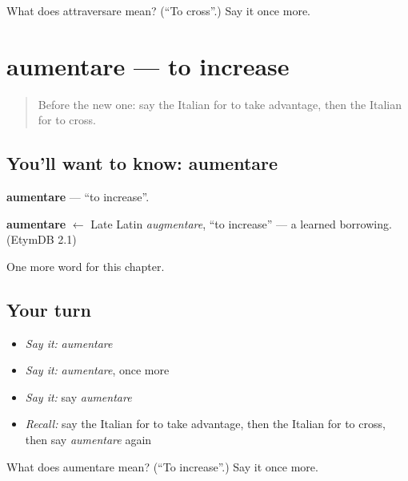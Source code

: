 \begin{tcolorbox}[breakable,colback=teal!4,colframe=teal!35!black,title={Before you move on}]
What does attraversare mean? (\textquotedblleft{}To cross\textquotedblright{}.) Say it once more.
\end{tcolorbox}
\section[aumentare]{aumentare — to increase}

\label{lesson:IT-C208-aumentare}



\begin{quote}
Before the new one: say the Italian for to take advantage, then the Italian for to cross.
\end{quote}

\subsection*{You'll want to know: aumentare}
\textbf{aumentare} — \textquotedblleft{}to increase\textquotedblright{}.

\begin{cousinweb}
\textbf{aumentare} $\leftarrow$ Late Latin \emph{augmentare}, \textquotedblleft{}to increase\textquotedblright{} — a learned borrowing. (EtymDB 2.1)
\end{cousinweb}

\begin{grammarlens}[title={What you've built}]
One more word for this chapter.
\end{grammarlens}

\subsection*{Your turn}
\begin{itemize}
\raggedright
  \item \emph{Say it:} \emph{aumentare}
  \item \emph{Say it:} \emph{aumentare}, once more
  \item \emph{Say it:} say \emph{aumentare}
  \item \emph{Recall:} say the Italian for to take advantage, then the Italian for to cross, then say \emph{aumentare} again
\end{itemize}

\begin{tcolorbox}[breakable,colback=teal!4,colframe=teal!35!black,title={Before you move on}]
What does aumentare mean? (\textquotedblleft{}To increase\textquotedblright{}.) Say it once more.
\end{tcolorbox}

